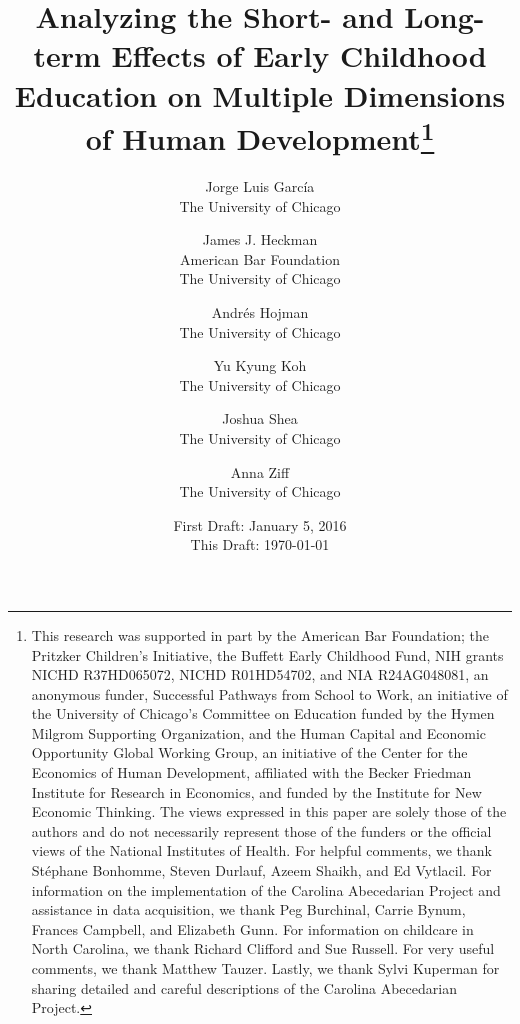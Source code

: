 




\title{\Large \textbf{Analyzing the Short- and Long-term Effects of Early Childhood Education on Multiple Dimensions of Human Development}\thanks{This research was supported in part by the American Bar Foundation; the Pritzker Children's Initiative, the
Buffett Early Childhood Fund, NIH grants NICHD R37HD065072, NICHD R01HD54702, and NIA R24AG048081, an
anonymous funder, Successful Pathways from School to Work, an initiative of the University of Chicago's Committee
on Education funded by the Hymen Milgrom Supporting Organization, and the Human Capital and Economic
Opportunity Global Working Group, an initiative of the Center for the Economics of Human Development, affiliated with
the Becker Friedman Institute for Research in Economics, and funded by the Institute for New Economic Thinking. The
views expressed in this paper are solely those of the authors and do not necessarily represent those of the funders or
the official views of the National Institutes of Health. For helpful comments, we thank St\'{e}phane Bonhomme, Steven Durlauf, Azeem Shaikh, and Ed Vytlacil. For information on the implementation of the Carolina Abecedarian Project and assistance in data acquisition, we thank Peg Burchinal, Carrie Bynum, Frances Campbell, and Elizabeth Gunn. For information on childcare in North Carolina, we thank Richard Clifford and Sue Russell. For very useful comments, we thank Matthew Tauzer. Lastly, we thank Sylvi Kuperman for sharing detailed and careful descriptions of the Carolina Abecedarian Project.}}

\author{
Jorge Luis Garc\'{i}a\\
The University of Chicago \and
James J. Heckman \\
American Bar Foundation \\
The University of Chicago \and
Andr\'{e}s Hojman\\
The University of Chicago \and
Yu Kyung Koh \\ 
The University of Chicago \and
Joshua Shea \\
The University of Chicago \and
Anna Ziff \\ 
The University of Chicago}
\date{First Draft: January 5, 2016\\ This Draft: \today}
\maketitle

